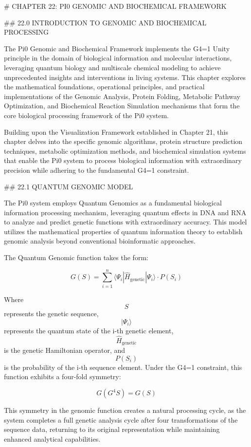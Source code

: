 # CHAPTER 22: PI0 GENOMIC AND BIOCHEMICAL FRAMEWORK

## 22.0 INTRODUCTION TO GENOMIC AND BIOCHEMICAL PROCESSING

The Pi0 Genomic and Biochemical Framework implements the G4=1 Unity principle in the domain of biological information and molecular interactions, leveraging quantum biology and multiscale chemical modeling to achieve unprecedented insights and interventions in living systems. This chapter explores the mathematical foundations, operational principles, and practical implementations of the Genomic Analysis, Protein Folding, Metabolic Pathway Optimization, and Biochemical Reaction Simulation mechanisms that form the core biological processing framework of the Pi0 system.

Building upon the Visualization Framework established in Chapter 21, this chapter delves into the specific genomic algorithms, protein structure prediction techniques, metabolic optimization methods, and biochemical simulation systems that enable the Pi0 system to process biological information with extraordinary precision while adhering to the fundamental G4=1 constraint.

## 22.1 QUANTUM GENOMIC MODEL

The Pi0 system employs Quantum Genomics as a fundamental biological information processing mechanism, leveraging quantum effects in DNA and RNA to analyze and predict genetic functions with extraordinary accuracy. This model utilizes the mathematical properties of quantum information theory to establish genomic analysis beyond conventional bioinformatic approaches.

The Quantum Genomic function takes the form:

$$ G(S) = \sum_{i=1}^{n} \langle \Psi_i | \hat{H}_{\text{genetic}} | \Psi_i \rangle \cdot P(S_i) $$

Where $$ S $$ represents the genetic sequence, $$ |\Psi_i\rangle $$ represents the quantum state of the i-th genetic element, $$ \hat{H}_{\text{genetic}} $$ is the genetic Hamiltonian operator, and $$ P(S_i) $$ is the probability of the i-th sequence element. Under the G4=1 constraint, this function exhibits a four-fold symmetry:

$$ G(G^4 S) = G(S) $$

This symmetry in the genomic function creates a natural processing cycle, as the system completes a full genetic analysis cycle after four transformations of the sequence data, returning to its original representation while maintaining enhanced analytical capabilities.

